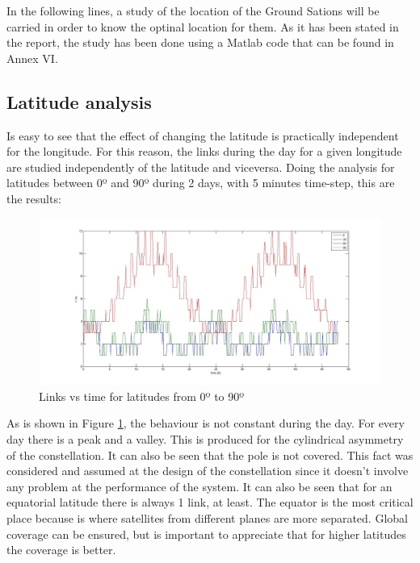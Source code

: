 In the following lines, a study of the location of the Ground Sations will be carried in order to know the optinal location for them. As it has been stated in the report, the study has been done using a Matlab code that can be found in Annex VI.

\subsection{Latitude analysis}
Is easy to see that the effect of changing the latitude is practically independent for the longitude. For this reason, the links during the day for a given longitude are studied independently of the latitude and viceversa. Doing the analysis for latitudes between 0º and 90º during 2 days, with 5 minutes time-step, this are the results:
\begin{figure}[H]
\begin{center}
\includegraphics[scale=0.30]{0_30_90_lat.jpg}
\caption{Links vs time for latitudes from 0º to 90º}
\label{fig:lat1}
\end{center}
\end{figure}
As is shown in Figure \ref{fig:lat1}, the behaviour is not constant during the day. For every day there is a peak and a valley. This is produced for the cylindrical asymmetry of the constellation. It can also be seen that the pole is not covered. This fact was considered and assumed at the design of the constellation since it doesn't involve any problem at the performance of the system. It can also be seen that for an equatorial latitude there is always 1 link, at least. The equator is the most critical place because is where satellites from different planes are more separated. Global coverage can be ensured, but is important to appreciate that for higher latitudes the coverage is better.

